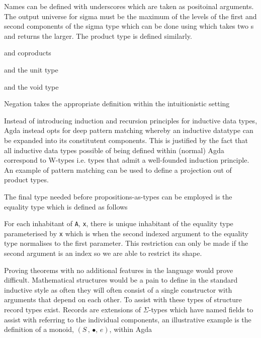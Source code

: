  Names can be defined
with underscores which are taken as positoinal arguments.  The output universe
for sigma must be the maximum of the levels of the first and second components
of the sigma type which can be done using  which
takes two s and returns the larger. The
product type is defined similarly.


and coproducts


and the unit type



and the void type


Negation takes the appropriate definition within the intuitionistic setting


Instead of introducing induction and recursion principles for inductive data
types, Agda instead opts for deep pattern matching whereby an inductive datatype
can be expanded into its constitutent components. This is justified by the fact
that all inductive data types possible of being defined within (normal) Agda
correspond to W-types i.e. types that admit a well-founded induction principle.
An example of pattern matching can be used to define a projection out of product
types.



The final type needed before propositions-as-types can be employed is the
equality type which is defined as follows


For each inhabitant of \verb|A|, \verb|x|, there is unique inhabitant of the
equality type parameterised by \verb|x| which is when the second indexed
argument to the equality type normalises to the first parameter. This
restriction can only be made if the second argument is an index so we are able
to restrict its shape.

Proving theorems with no additional features in the language would prove
difficult. Mathematical structures would be a pain to define in the standard
inductive style as often they will often consist of a single constructor with
arguments that depend on each other. To assist with these types of structure
record types exist. Records are extensions of $\Sigma$-types which have named
fields to assist with referring to the individual components, an illustrative
example is the definition of a monoid, $(S \, , \, \bullet , \, e)$, within Agda

